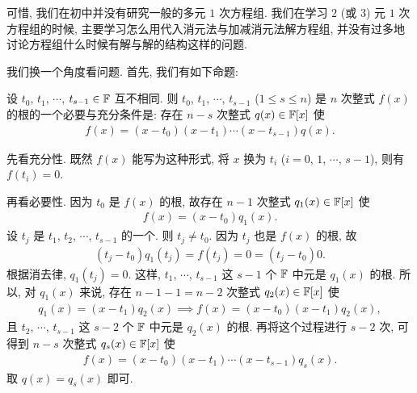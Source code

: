 可惜, 我们在初中并没有研究一般的多元 $1$ 次方程组. 我们在学习 $2$ (或 $3$) 元 $1$ 次方程组的时候, 主要学习怎么用代入消元法与加减消元法解方程组, 并没有过多地讨论方程组什么时候有解与解的结构这样的问题.

我们换一个角度看问题. 首先, 我们有如下命题:

\begin{proposition}
    设 $t_0$, $t_1$, $\cdots$, $t_{s-1} \in \mathbb{F}$ 互不相同. 则 $t_0$, $t_1$, $\cdots$, $t_{s-1}$ ($1 \leq s \leq n$) 是 $n$ 次整式 $f(x)$ 的根的一个必要与充分条件是: 存在 $n-s$ 次整式 $q(x) \in \mathbb{F}[x]$ 使
    \begin{align*}
        f(x) = (x - t_0)(x - t_1) \cdots (x-t_{s-1}) q(x).
    \end{align*}
\end{proposition}

\begin{pf}
    先看充分性. 既然 $f(x)$ 能写为这种形式, 将 $x$ 换为 $t_i$ ($i = 0$, $1$, $\cdots$, $s-1$), 则有 $f(t_i) = 0$.

    再看必要性. 因为 $t_0$ 是 $f(x)$ 的根, 故存在 $n-1$ 次整式 $q_1 (x) \in \mathbb{F}[x]$ 使
    \begin{align*}
        f(x) = (x - t_0) q_1 (x).
    \end{align*}
    设 $t_j$ 是 $t_1$, $t_2$, $\cdots$, $t_{s-1}$ 的一个. 则 $t_j \neq t_0$. 因为 $t_j$ 也是 $f(x)$ 的根, 故
    \begin{align*}
        (t_j - t_0) q_1 (t_j) = f(t_j) = 0 = (t_j - t_0) 0.
    \end{align*}
    根据消去律, $q_1 (t_j) = 0$. 这样, $t_1$, $\cdots$, $t_{s-1}$ 这 $s-1$ 个 $\mathbb{F}$ 中元是 $q_1 (x)$ 的根. 所以, 对 $q_1 (x)$ 来说, 存在 $n-1-1 = n-2$ 次整式 $q_2 (x) \in \mathbb{F}[x]$ 使
    \begin{align*}
        q_1 (x) = (x - t_1) q_2 (x) \implies f(x) = (x - t_0) (x - t_1) q_2 (x),
    \end{align*}
    且 $t_2$, $\cdots$, $t_{s-1}$ 这 $s-2$ 个 $\mathbb{F}$ 中元是 $q_2 (x)$ 的根. 再将这个过程进行 $s-2$ 次, 可得到 $n-s$ 次整式 $q_s (x) \in \mathbb{F}[x]$ 使
    \begin{align*}
        f(x) = (x - t_0) (x - t_1) \cdots (x - t_{s-1}) q_s (x).
    \end{align*}
    取 $q(x) = q_s (x)$ 即可.
\end{pf}

